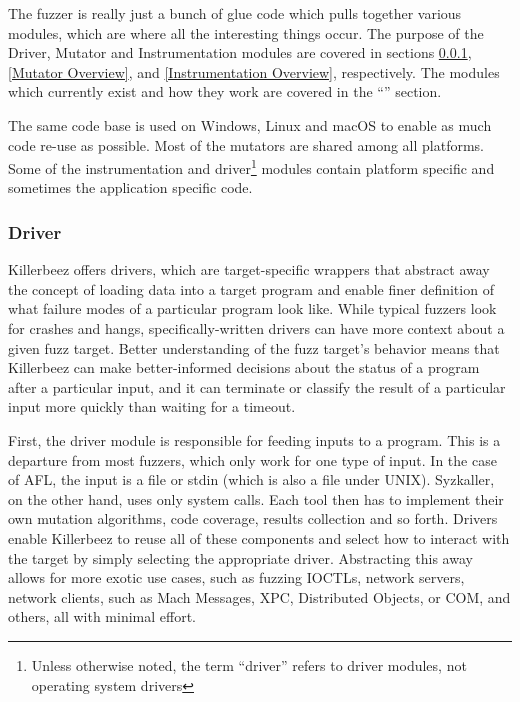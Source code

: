 \begin{multicols}{2}

The fuzzer is really just a bunch of glue code which pulls together various
modules, which are where all the interesting things occur. The purpose of
the Driver, Mutator and Instrumentation modules are covered in sections
\ref{Driver Overview}, \ref{Mutator Overview}, and
\ref{Instrumentation Overview}, respectively.  The modules which currently
exist and how they work are covered in the ``''
section.

The same code base is used on Windows, Linux and macOS to enable as much code
re-use as possible.  Most of the mutators are shared among all platforms.
Some of the instrumentation and driver\footnote{Unless otherwise noted,
the term ``driver'' refers to driver modules, not operating system drivers}
modules contain platform specific and sometimes the application specific code.

\subsubsection{Driver} \label{Driver Overview}
Killerbeez offers drivers, which are target-specific wrappers that abstract
away the concept of loading data into a target program and enable finer
definition of what failure modes of a particular program look like. While
typical fuzzers look for crashes and hangs, specifically-written drivers can
have more context about a given fuzz target.  Better understanding of the fuzz
target's behavior means that Killerbeez can make better-informed decisions
about the status of a program after a particular input, and it can terminate or
classify the result of a particular input more quickly than waiting for a
timeout.

First, the driver module is responsible for feeding inputs to a program.  This
is a departure from most fuzzers, which only work for one type of input.  In
the case of AFL, the input is a file or stdin (which is also a file under
UNIX).  Syzkaller\cite{syzkaller}, on the other hand, uses only system calls.
Each tool then has to implement their own mutation algorithms, code coverage,
results collection and so forth. Drivers enable Killerbeez to reuse all of
these components and select how to interact with the target by simply selecting
the appropriate driver.  Abstracting this away allows for more exotic use
cases, such as fuzzing IOCTLs, network servers, network clients, \IPC{} such as
Mach Messages, XPC, Distributed Objects, or COM, and others, all with minimal
effort.


\end{multicols}
